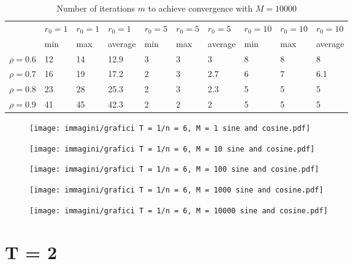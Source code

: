 \documentclass[a4paper,11pt,openright]{report}
\begin{document}
\begin{table}[H]
\centering
\addtolength{\leftskip}{-1.5cm}
\addtolength{\rightskip}{-1.5cm}
\begin{tabular}{|c|lllllllll|}
\hline
$ $ & $r_0 = 1$ & $r_0 = 1$ & $r_0 = 1$ & $r_0 = 5$ & $r_0 = 5$ & $r_0 = 5$ & $r_0 = 10$ & $r_0 = 10$ & $r_0 = 10$  \\
$ $ & min & max & average & min & max & average & min & max & average \\ 
\hline
$\rho = 0.6$ & 12 & 14 & 12.9 & 3 & 3 & 3 & 8 & 8 & 8 \\

$\rho = 0.7$ & 16 & 19 & 17.2 & 2 & 3 & 2.7 & 6 & 7 & 6.1\\

$\rho = 0.8$ & 23 & 28 & 25.3 & 2 & 3 & 2.3 & 5 & 5 & 5\\

$\rho = 0.9$ & 41 & 45 & 42.3 & 2 & 2 & 2 & 5 & 5 & 5\\
\hline
\end{tabular}
\caption{Number of iterations $m$ to achieve convergence with $M = 10000$}
\end{table}
\begin{figure}[H]
\centering
\texttt{[image: immagini/grafici T = 1/n = 6, M = 1 sine and cosine.pdf]}
\end{figure}
\begin{figure}[H]
\centering
\texttt{[image: immagini/grafici T = 1/n = 6, M = 10 sine and cosine.pdf]}
\end{figure}
\begin{figure}[H]
\centering
\texttt{[image: immagini/grafici T = 1/n = 6, M = 100 sine and cosine.pdf]}
\end{figure}
\begin{figure}[H]
\centering
\texttt{[image: immagini/grafici T = 1/n = 6, M = 1000 sine and cosine.pdf]}
\end{figure}
\begin{figure}[H]
\centering
\texttt{[image: immagini/grafici T = 1/n = 6, M = 10000 sine and cosine.pdf]}
\end{figure}
\newpage
\section{T = 2}
\end{document}
